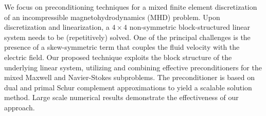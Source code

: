 \documentclass{article}
\begin{document}

We focus on preconditioning techniques for a mixed finite element discretization of an incompressible magnetohydrodynamics (MHD) problem. Upon discretization and linearization, a $4\times4$ non-symmetric block-structured linear system needs to be (repetitively) solved. One of the principal challenges is the presence of a skew-symmetric term that couples the fluid velocity with the electric field. Our proposed technique exploits the block structure of the underlying linear system, utilizing and combining effective preconditioners for the mixed Maxwell and Navier-Stokes subproblems. The preconditioner is based on dual and primal Schur complement approximations to yield a scalable solution method. Large scale numerical results demonstrate the effectiveness of our approach.

\end{document}
